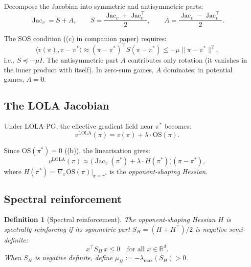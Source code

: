 \documentclass[11pt,a4paper]{article}
\newtheorem{definition}[theorem]{Definition}
\DeclareMathOperator{\Jac}{Jac}
\newcommand{\R}{\mathbb{R}}
\newcommand{\ip}[2]{\langle #1, #2 \rangle}
\begin{document}
Decompose the Jacobian into symmetric and antisymmetric parts:
\begin{equation}
    \Jac_v = S + A, \qquad S = \frac{\Jac_v + \Jac_v^\top}{2}, \qquad A = \frac{\Jac_v - \Jac_v^\top}{2}.
\end{equation}

The SOS condition ((c) in companion paper) requires:
\begin{equation}
    \ip{v(\pi)}{\pi - \pi^*} \approx (\pi - \pi^*)^\top S (\pi - \pi^*) \leq -\mu \|\pi - \pi^*\|^2,
\end{equation}
i.e., $S \preceq -\mu I$. The antisymmetric part $A$ contributes only rotation (it vanishes in the inner product with itself). In zero-sum games, $A$ dominates; in potential games, $A = 0$.

\subsection{The LOLA Jacobian}

Under LOLA-PG, the effective gradient field near $\pi^*$ becomes:
\begin{equation}
    v^{\mathrm{LOLA}}(\pi) = v(\pi) + \lambda \cdot \mathrm{OS}(\pi).
\end{equation}

Since $\mathrm{OS}(\pi^*) = 0$ ((b)), the linearisation gives:
\begin{equation}
    v^{\mathrm{LOLA}}(\pi) \approx \bigl(\Jac_v(\pi^*) + \lambda \cdot H(\pi^*)\bigr)(\pi - \pi^*),
\end{equation}
where $H(\pi^*) = \nabla_\pi \mathrm{OS}(\pi)\big|_{\pi=\pi^*}$ is the \emph{opponent-shaping Hessian}.

\subsection{Spectral reinforcement}

\begin{definition}[Spectral reinforcement]
\label{def:spectral}
The opponent-shaping Hessian $H$ is \emph{spectrally reinforcing} if its symmetric part $S_H = (H + H^\top)/2$ is negative semi-definite:
\begin{equation}
    x^\top S_H \, x \leq 0 \quad \text{for all } x \in \R^d.
\end{equation}
When $S_H$ is negative definite, define $\mu_H := -\lambda_{\max}(S_H) > 0$.
\end{definition}
\end{document}
